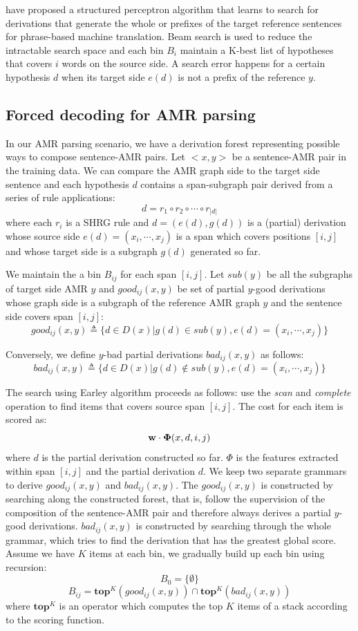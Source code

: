  have proposed a structured perceptron algorithm that learns to search for derivations that generate the whole or prefixes of the 
target reference sentences for phrase-based machine translation. Beam search is used to reduce the intractable search space and each bin $B_i$ maintain a K-best list of hypotheses that covers $i$ words
on the source side. A search error happens for a certain hypothesis $d$ when its target side $e(d)$ is not a prefix of the reference $y$.

\subsection{Forced decoding for AMR parsing}
In our AMR parsing scenario, we have a derivation forest representing possible ways to compose sentence-AMR pairs. Let $<x, y>$ be a sentence-AMR pair in the training data. We can 
compare the AMR graph side to the target side sentence and each hypothesis $d$ contains a span-subgraph pair derived from a series of rule applications:
$$d = r_1 \circ r_2 \circ \cdots \circ r_{|d|}$$
where each $r_i$ is a SHRG rule and $d=(e(d), g(d))$ is a (partial) derivation whose source side $e(d)=(x_i, \cdots , x_j)$ is a span which covers 
positions $[i, j]$ and whose target side is a subgraph $g(d)$ generated so far. 


We maintain the a bin $B_{ij}$ for each span $[i, j]$. Let $sub(y)$ be all the subgraphs
of target side AMR $y$ and $good_{ij} (x, y)$ be set of partial $y$-good derivations whose graph side is a subgraph of the reference AMR graph $y$
and the sentence side covers span $[i, j]$:
$$good_{ij}(x, y)\triangleq \{d \in D(x) | g(d) \in sub(y), e(d)=(x_i, \cdots , x_j)\}$$

Conversely, we define $y$-bad partial derivations $bad_{ij}(x,y)$ as follows:
$$bad_{ij}(x, y)\triangleq \{d \in D(x) | g(d) \notin sub(y), e(d)=(x_i, \cdots , x_j)\}$$

The search using Earley algorithm proceeds as follows: use the \textit{scan} and \textit{complete} operation to find items that covers source span $[i, j]$. 
The cost for each item is scored as: 
$${\bf w} \cdot {\bf \Phi}(x, d, i, j)$$
where $d$ is the partial derivation constructed so far. $\Phi$ is the features extracted within span $[i, j]$ and the partial derivation $d$. We keep two separate
grammars to derive $good_{ij}(x, y)$ and $bad_{ij}(x, y)$. The $good_{ij}(x, y)$ is constructed by searching along the constructed forest, that is, follow the supervision of
the composition of the sentence-AMR pair and therefore always derives a partial $y$-good derivations. $bad_{ij}(x, y)$ is constructed by searching through the whole grammar, which tries to find the derivation that has the greatest
global score. Assume we have $K$ items at each bin, we gradually build up each bin using recursion:
$$B_0 = \{ \emptyset \}$$
$$B_{ij} = \textbf{top}^K (good_{ij}(x,y)) \cap \textbf{top}^K (bad_{ij}(x,y))$$
where $\textbf{top}^K$ is an operator which computes the top $K$ items of a stack according to the scoring function.
